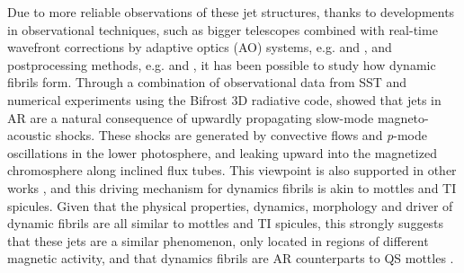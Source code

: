 Due to more reliable observations of these jet structures, thanks to developments in observational techniques, such as bigger telescopes combined with real-time wavefront corrections by adaptive optics (AO) systems, e.g. \cite{Scharmer2003SPIE4853370S} and \cite{Rimmele2000SPIE4007218R}, and postprocessing methods, e.g. \cite{van2005SoPh228191V} and \cite{von1993AA268374V}, it has been possible to study how dynamic fibrils form. Through a combination of observational data from SST and numerical experiments using the Bifrost 3D radiative code, \cite{Hansteen2006ApJ} showed that jets in AR are a natural consequence of upwardly propagating slow-mode magneto-acoustic shocks. These shocks are generated by convective flows and \textit{p}-mode oscillations in the lower photosphere, and leaking upward into the magnetized chromosphere along inclined flux tubes. This viewpoint is also supported in other works \citep{Heggland2007ApJ6661277H,De_Pontieu2007ApJ,Pontieu2004Natur,Suematsu1990LNP367211S}, and this driving mechanism for dynamics fibrils is akin to mottles and TI spicules. Given that the physical properties, dynamics, morphology and driver of dynamic fibrils are all similar to mottles and TI spicules, this strongly suggests that these jets are a similar phenomenon, only located in regions of different magnetic activity, and that dynamics fibrils are AR counterparts to QS mottles \citep{Rouppe2007ApJ660L169R}.
